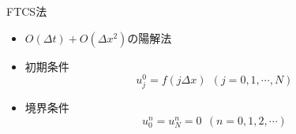 \begin{frame}[t]{FTCS法}
  \begin{itemize}
  \item $O(\Delta t) + O(\Delta x^2)$の陽解法
    \begin{center}
    \end{center}
  \item 初期条件
    \[
    u_j^0 = f(j\Delta x) \ \ (j=0,1,\cdots,N)
    \]
  \item 境界条件
    \[
    u_0^n = u_N^n = 0 \ \ (n=0,1,2,\cdots)
    \]
  \end{itemize}
\end{frame}
